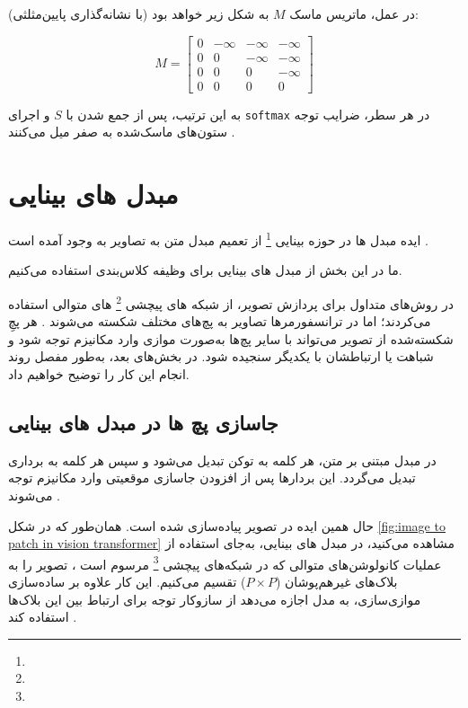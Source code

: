 در عمل، ماتریس ماسک \( M \) به شکل زیر خواهد بود (با نشانه‌گذاری پایین‌مثلثی):


\[
M =
\begin{bmatrix}
	0 & -\infty & -\infty & -\infty \\
	0 & 0 & -\infty & -\infty \\
	0 & 0 & 0 & -\infty \\
	0 & 0 & 0 & 0
\end{bmatrix}
\]

به این ترتیب، پس از جمع شدن با \( S \) و اجرای \texttt{softmax} در هر سطر، ضرایب توجه ستون‌های ماسک‌شده به صفر میل می‌کنند \cite{vaswani2017attention}.

 
\section{مبدل های بینایی}

ایده مبدل ها در حوزه بینایی \footnote{} از تعمیم مبدل متن به تصاویر به وجود آمده است \cite{dosovitskiy2020image}.

ما در این بخش از مبدل های بینایی برای وظیفه کلاس‌بندی استفاده می‌کنیم.

در روش‌های متداول برای پردازش تصویر، از شبکه های پیچشی \footnote{} ‌های متوالی استفاده می‌کردند؛ اما در ترانسفورمرها تصاویر به پچ‌های مختلف شکسته می‌شوند \cite{dosovitskiy2020image}. هر پچِ شکسته‌شده از تصویر می‌تواند با سایر پچ‌ها به‌صورت موازی وارد مکانیزم توجه  شود و شباهت یا ارتباطشان با یکدیگر سنجیده شود. در بخش‌های بعد، به‌طور مفصل روند انجام این کار را توضیح خواهیم داد.


\subsection{جاسازی پچ ها در مبدل های بینایی}
در مبدل مبتنی بر متن، هر کلمه به توکن تبدیل می‌شود و سپس هر کلمه به برداری تبدیل می‌گردد. این بردارها پس از افزودن جاسازی موقعیتی وارد مکانیزم توجه می‌شوند \cite{vaswani2017attention}. 

حال همین ایده در تصویر پیاده‌سازی شده است. همان‌طور که در شکل \ref{fig:image to patch in vision transformer} مشاهده می‌کنید، در مبدل های بینایی، به‌جای استفاده از عملیات کانولوشن‌های متوالی که در شبکه‌های پیچشی \footnote{} مرسوم است \cite{lecun1998gradient,krizhevsky2012imagenet,he2016deep}، تصویر را به بلاک‌های غیرهم‌پوشان (\(P \times P\)) تقسیم می‌کنیم. این کار علاوه بر ساده‌سازی موازی‌سازی، به مدل اجازه می‌دهد از سازوکار توجه برای ارتباط بین این بلاک‌ها استفاده کند \cite{dosovitskiy2020image}.

